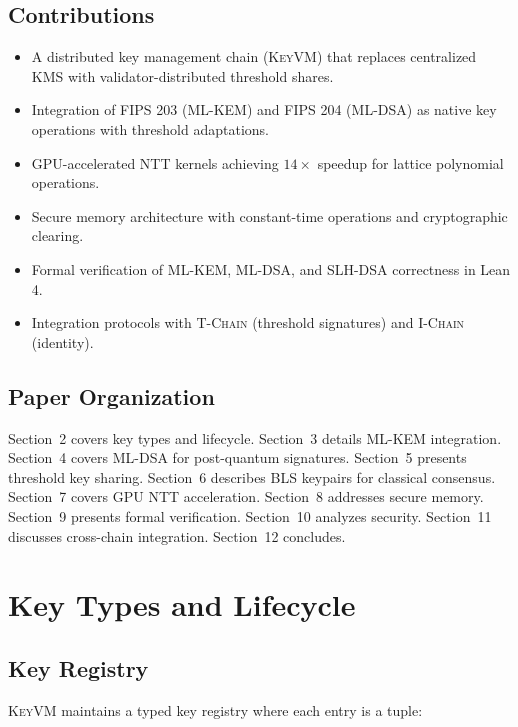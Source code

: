 \documentclass[11pt,letterpaper]{article}
\theoremstyle{definition}
\theoremstyle{remark}
\newcommand{\TChain}{\textsc{T-Chain}}
\newcommand{\IChain}{\textsc{I-Chain}}
\newcommand{\KeyVM}{\textsc{KeyVM}}
\begin{document}
\subsection{Contributions}

\begin{itemize}
\item A distributed key management chain (\KeyVM{}) that replaces centralized KMS with validator-distributed threshold shares.
\item Integration of FIPS 203 (ML-KEM) and FIPS 204 (ML-DSA) as native key operations with threshold adaptations.
\item GPU-accelerated NTT kernels achieving $14\times$ speedup for lattice polynomial operations.
\item Secure memory architecture with constant-time operations and cryptographic clearing.
\item Formal verification of ML-KEM, ML-DSA, and SLH-DSA correctness in Lean 4.
\item Integration protocols with \TChain{} (threshold signatures) and \IChain{} (identity).
\end{itemize}

\subsection{Paper Organization}

Section~2 covers key types and lifecycle. Section~3 details ML-KEM integration. Section~4 covers ML-DSA for post-quantum signatures. Section~5 presents threshold key sharing. Section~6 describes BLS keypairs for classical consensus. Section~7 covers GPU NTT acceleration. Section~8 addresses secure memory. Section~9 presents formal verification. Section~10 analyzes security. Section~11 discusses cross-chain integration. Section~12 concludes.

\section{Key Types and Lifecycle}

\subsection{Key Registry}

\KeyVM{} maintains a typed key registry where each entry is a tuple:
\end{document}
